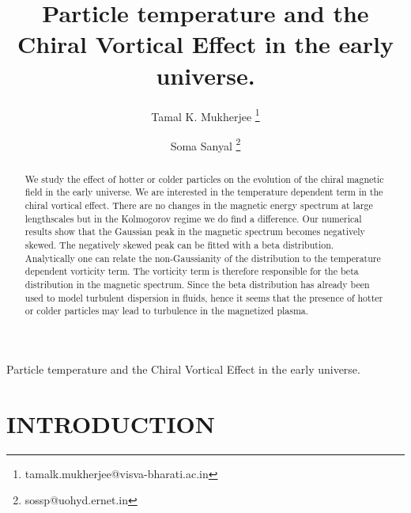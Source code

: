 \documentclass{ws-mpla}
\begin{document}
{Particle temperature and the Chiral Vortical Effect in the early universe.}


\title{Particle temperature and the Chiral Vortical Effect in the early universe.}

\author{\footnotesize Tamal K. Mukherjee
\footnote{tamalk.mukherjee@visva-bharati.ac.in}}
\address{Department of Physics, Visva Bharati, Santiniketan 731235, India}
\author{\footnotesize Soma Sanyal
\footnote{sossp@uohyd.ernet.in}}
\address{School of Physics, University of Hyderabad, Telangana, 500046, 
India}

\maketitle

\begin{abstract}

We study the effect of hotter or colder particles on the evolution of the chiral magnetic field in the early universe. We are interested in the temperature dependent 
term in the chiral vortical effect. There are no changes in the magnetic energy spectrum at large lengthscales but in the Kolmogorov regime we do find a 
difference. Our numerical results show that the Gaussian peak in the magnetic spectrum becomes negatively skewed. The negatively skewed peak can be 
fitted with a beta distribution.  Analytically one can relate the non-Gaussianity of the distribution to the temperature dependent vorticity term. 
The vorticity term is therefore responsible for the beta distribution in the magnetic spectrum. Since the beta distribution has already been used to model 
turbulent dispersion in fluids, hence it seems that the presence of hotter or colder particles may lead to turbulence in the magnetized plasma.


 
 

\end{abstract}




\section{INTRODUCTION}
\label{sec:intro} 
\end{document}

